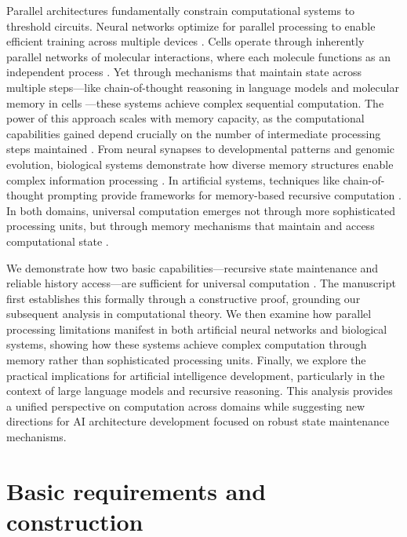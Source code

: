 \documentclass[12pt]{article}
\begin{document}
Parallel architectures fundamentally constrain computational systems to threshold circuits.
Neural networks optimize for parallel processing to enable efficient training across multiple devices \cite{merrill2023parallelism,merrill2024}.
Cells operate through inherently parallel networks of molecular interactions, where each molecule functions as an independent process \cite{fu2023scgrn}.
Yet through mechanisms that maintain state across multiple steps---like chain-of-thought reasoning in language models \cite{wei2022chain,qiu2024ask} and molecular memory in cells \cite{hoel2020emergence}---these systems achieve complex sequential computation.
The power of this approach scales with memory capacity, as the computational capabilities gained depend crucially on the number of intermediate processing steps maintained \cite{merrill2024}.
From neural synapses to developmental patterns and genomic evolution, biological systems demonstrate how diverse memory structures enable complex information processing \cite{burrill2010making,espinosa2024molecular}.
In artificial systems, techniques like chain-of-thought prompting provide frameworks for memory-based recursive computation \cite{wei2022chain,dickson2024trust,ahn2024recursive}.
In both domains, universal computation emerges not through more sophisticated processing units, but through memory mechanisms that maintain and access computational state \cite{schuurmans2024autoregressive}.

We demonstrate how two basic capabilities---recursive state maintenance and reliable history access---are sufficient for universal computation \cite{bennett1989time,boyle2024memory}. The manuscript first establishes this formally through a constructive proof, grounding our subsequent analysis in computational theory. We then examine how parallel processing limitations manifest in both artificial neural networks and biological systems, showing how these systems achieve complex computation through memory rather than sophisticated processing units. Finally, we explore the practical implications for artificial intelligence development, particularly in the context of large language models and recursive reasoning. This analysis provides a unified perspective on computation across domains while suggesting new directions for AI architecture development focused on robust state maintenance mechanisms.

\section{Basic requirements and construction}
\end{document}

